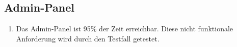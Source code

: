\subsection*{Admin-Panel}

\begin{samepage}
    \begin{enumerate}[label=\textbf{/NFV\arabic*0/}, align=left]
        \item \label{/NFV10/} Das \Gls{Admin-Panel} ist 95\% der Zeit erreichbar. Diese nicht funktionale Anforderung wird durch den Testfall  getestet.
    \end{enumerate}
\end{samepage}